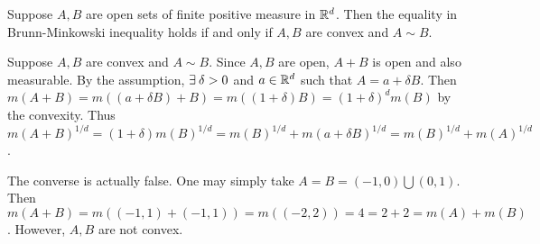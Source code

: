 \begin{problem}
    Suppose $A,B$ are open sets of finite positive measure in 
    $\mathbb{R}^d$. Then the equality in Brunn-Minkowski inequality 
    holds if and only if $A,B$ are convex and $A\sim B$. 
\end{problem}
\begin{pf}
    Suppose $A,B$ are convex and $A\sim B$. Since $A,B$ are 
    open, $A+B$ is open and also measurable. By the assumption, 
    $\exists\: \delta>0$ and $a\in\mathbb{R}^d$ such that $A = 
    a+\delta B$. Then $m(A+B) = m((a+\delta B)+B) = 
    m((1+\delta)B) = (1+\delta)^d m(B)$ by the convexity. 
    Thus $m(A+B)^{1/d} = (1+\delta)m(B)^{1/d} = m(B)^{1/d} + 
    m(a+\delta B)^{1/d} = m(B)^{1/d} + m(A)^{1/d}$. 

    The converse is actually false. One may simply take $A=B
    =(-1,0)\bigcup(0,1)$. Then $m(A+B)=m((-1,1)+(-1,1))= 
    m((-2,2)) = 4 = 2+2 = m(A)+m(B)$. However, $A,B$ are not 
    convex.
\end{pf}

